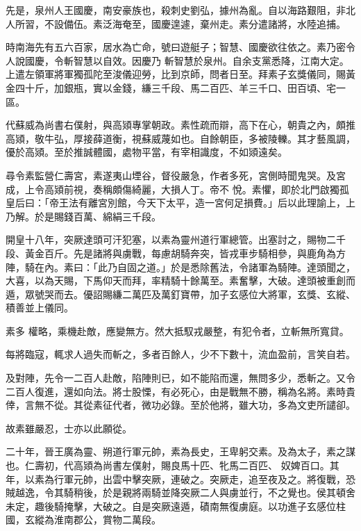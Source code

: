 \begin{pinyinscope}
 先是，泉州人王國慶，南安豪族也，殺刺史劉弘，據州為亂。自以海路艱阻，非北人所習，不設備伍。素泛海奄至，國慶遑遽，棄州走。素分遣諸將，水陸追捕。



 時南海先有五六百家，居水為亡命，號曰遊艇子；智慧、國慶欲往依之。素乃密令人說國慶，令斬智慧以自效。因慶乃
 斬智慧於泉州。自余支黨悉降，江南大定。上遣左領軍將軍獨孤陀至浚儀迎勞，比到京師，問者日至。拜素子玄獎儀同，賜黃金四十斤，加銀瓶，實以金錢，縑三千段、馬二百匹、羊三千口、田百頃、宅一區。



 代蘇威為尚書右僕射，與高熲專掌朝政。素性疏而辯，高下在心，朝貴之內，頗推高熲，敬牛弘，厚接薛道衡，視蘇威蔑如也。自餘朝臣，多被陵轢。其才藝風調，優於高熲。至於推誠體國，處物平當，有宰相識度，不如熲遠矣。



 尋令素監營仁壽宮，素遂夷山堙谷，督役嚴急，作者多死，宮側時聞鬼哭。及宮成，上令高熲前視，奏稱頗傷綺麗，大損人丁。帝不
 悅。素懼，即於北門啟獨孤皇后曰：「帝王法有離宮別館，今天下太平，造一宮何足損費。」后以此理諭上，上乃解。於是賜錢百萬、綿絹三千段。



 開皇十八年，突厥達頭可汗犯塞，以素為靈州道行軍總管。出塞討之，賜物二千段、黃金百斤。先是諸將與虜戰，每慮胡騎奔突，皆戎車步騎相參，與鹿角為方陣，騎在內。素曰：「此乃自固之道。」於是悉除舊法，令諸軍為騎陣。達頭聞之，大喜，以為天賜，下馬仰天而拜，率精騎十餘萬至。素奮擊，大破。達頭被重創而遁，眾號哭而去。優詔賜縑二萬匹及萬釘寶帶，加子玄感位大將軍，玄獎、玄縱、積善並上儀同。



 素多
 權略，乘機赴敵，應變無方。然大抵馭戎嚴整，有犯令者，立斬無所寬貸。



 每將臨寇，輒求人過失而斬之，多者百餘人，少不下數十，流血盈前，言笑自若。



 及對陣，先令一二百人赴敵，陷陣則已，如不能陷而還，無問多少，悉斬之。又令二百人復進，還如向法。將士股慄，有必死心，由是戰無不勝，稱為名將。素時貴倖，言無不從。其從素征代者，微功必錄。至於他將，雖大功，多為文吏所譴卻。



 故素雖嚴忍，士亦以此願從。



 二十年，晉王廣為靈、朔道行軍元帥，素為長史，王卑躬交素。及為太子，素之謀也。仁壽初，代高熲為尚書左僕射，賜良馬十匹、牝馬二百匹、
 奴婢百口。其年，以素為行軍元帥，出雲中擊突厥，連破之。突厥走，追至夜及之。將復戰，恐賊越逸，令其騎稍後，於是親將兩騎並降突厥二人與虜並行，不之覺也。侯其頓舍未定，趣後騎掩擊，大破之。自是突厥遠遁，磧南無復虜庭。以功進子玄感位柱國，玄縱為淮南郡公，賞物二萬段。




\end{pinyinscope}
